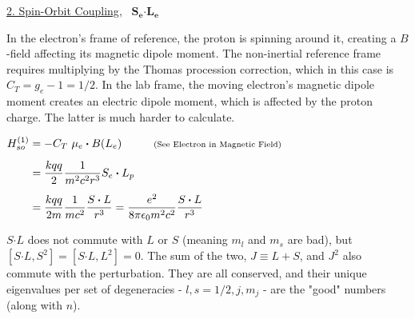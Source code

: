 \documentclass[12pt]{article}
\newcommand*{\dotP}{\boldsymbol \cdot}	%
\begin{document}
\vspace{20pt}
\noindent
\underline{2. Spin-Orbit Coupling}, \ \(\boldsymbol{S_e \dotP L_e}\)

\vspace{10pt} \noindent 
{\scriptsize In the electron's frame of reference, the proton is spinning around it, creating a \(B\)-field 
affecting its magnetic dipole moment. The non-inertial reference frame requires multiplying by the Thomas 
procession correction, which in this case is \(C_T = g_e-1 = 1/2\). In the lab frame, the moving electron's 
magnetic dipole moment creates an electric dipole moment, which is affected by the proton charge. The latter
is much harder to calculate.}

\begin{center}
    \(\begin{aligned}
        H_{so}^{(1)} &= - C_T \ \mu_e \dotP B(L_e)  
            \hspace{1cm} \text{\scriptsize(See Electron in Magnetic Field)}\\[5pt]
        &= \frac{kqq}{2} \frac{1}{m^2 c^2 r^3} S_e \dotP L_p\\[5pt]
        &= \frac{kqq}{2m} \frac{1}{m c^2} \frac{S \dotP L}{r^3} 
            = \frac{e^2}{8 \pi \epsilon_0 m^2 c^2} \frac{S \dotP L}{r^3} 
    \end{aligned}\)
\end{center}

\vspace{5pt} \noindent
\(S \dotP L\) does not commute with \(L\) or \(S\) (meaning \(m_l\) and \(m_s\) are bad), but 
\([S \dotP L, S^2] = [S \dotP L, L^2] = 0\). The sum of the two, \(J \equiv L + S\), and 
\(J^2\) also commute with the perturbation. They are all conserved, and their unique
eigenvalues per set of degeneracies - \(l, s{\scriptstyle=1/2}, j, m_j\) - are the "good" 
numbers (along with \(n\)).
\end{document}
